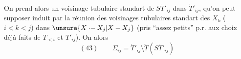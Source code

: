 On prend alors un voisinage tubulaire standart
 de $S\dot T'_{ij}$ dans $\dot T'_{ij}$,
qu'on peut supposer induit par la réunion 
des voisinages tubulaires standart des $X_k$ ($i<k<j$)
dans $\unsure{X\mathbin{\cdot-}X_j|X-X_j}$
(pris ``assez petits'' p.r. aux choix déjà faits de $T_{<i}$
et  $T'_{ij}$).
On  alors
\[
(43)\qquad\Sigma_{ij}=\dot T'_{ij}\setminus\mathring T(S\dot T'_{ij})
\]

